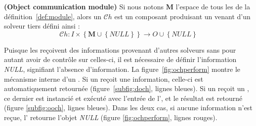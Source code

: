 \documentclass{jfpc-preprint}
\begin{document}

\begin{definition}\label{def:oopench} \textbf{(Object communication module)} 
Si nous notons $\mathbf{M}$ l'espace  de  tous  les \oms{} de la définition~\ref{def:module}, alors un \oopch{} $\mathcal{C}h$ est  un composant produisant un \om{}  venant d'un solveur tiers défini ainsi :
\begin{equation}
\mathcal{C}h:I\times\left\{\mathbf{M}\cup\left\{NULL\right\}\right\} \rightarrow O\cup\left\{NULL\right\}
\end{equation}
\end{definition}

Puisque les \opchs{}  reçoivent  des  informations  provenant  d'autres solveurs sans pour autant avoir de contrôle sur celles-ci, il est  nécessaire  de  définir   l'information  {\it  NULL},  signifiant l'absence  d'information.  La  figure~\ref{fig:ochperform}  montre  le mécanisme interne d'un  \opch{}. Si un \dopch{} reçoit une  information,  celle-ci   est  automatiquement  retournée  (figure~\ref{subfig:doch},  lignes bleues).  Si un  \oopch{} reçoit un \om{}, ce dernier est instancié et exécuté avec l'entrée de l'\opch, et  le résultat  est retourné  (figure \ref{subfig:ooch}, lignes bleues). Dans les deux  cas, si aucune information n'est reçue, l'\opch{}  retourne l'objet  {\it NULL}  (figure \ref{fig:ochperform}, lignes rouges).
\end{document}
